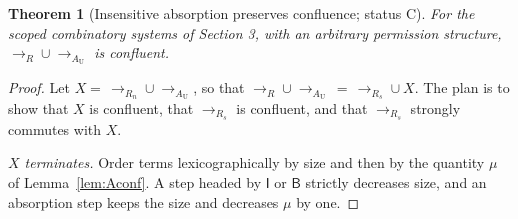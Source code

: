 \documentclass[11pt]{article}
\newtheorem{theorem}{Theorem}[section]
\theoremstyle{definition}
\theoremstyle{remark}
\newcommand{\cI}{\mathsf{I}}
\newcommand{\cB}{\mathsf{B}}
\newcommand{\Ct}{status C}
\begin{document}
\begin{theorem}[Insensitive absorption preserves confluence; \Ct]\label{thm:insensitive}
For the scoped combinatory systems of Section 3, with an arbitrary permission structure, $\to_R\cup\to_{A_{\mathrm U}}$ is confluent.
\end{theorem}

\begin{proof}
Let $X=\,\to_{R_n}\cup\to_{A_{\mathrm U}}$, so that $\to_R\cup\to_{A_{\mathrm U}}\,=\,\to_{R_s}\cup X$. The plan is to show that $X$ is confluent, that $\to_{R_s}$ is confluent, and that $\to_{R_s}$ strongly commutes with $X$.

\emph{$X$ terminates.} Order terms lexicographically by size and then by the quantity $\mu$ of Lemma~\ref{lem:Aconf}. A step headed by $\cI$ or $\cB$ strictly decreases size, and an absorption step keeps the size and decreases $\mu$ by one.


\end{proof}
\end{document}
